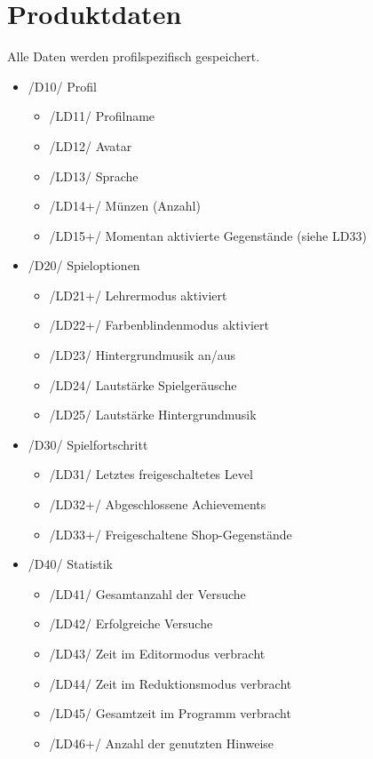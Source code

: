 \section{Produktdaten}

Alle Daten werden profilspezifisch gespeichert.

\begin{itemize}

\item /D10/ Profil
\begin{itemize}
\item /LD11/ Profilname
\item /LD12/ Avatar
\item /LD13/ Sprache
\item /LD14+/ Münzen (Anzahl)
\item /LD15+/ Momentan aktivierte Gegenstände (siehe LD33)
\end{itemize}

\item /D20/ Spieloptionen
\begin{itemize}
\item /LD21+/ Lehrermodus aktiviert
\item /LD22+/ Farbenblindenmodus aktiviert
\item /LD23/ Hintergrundmusik an/aus
\item /LD24/ Lautstärke Spielgeräusche
\item /LD25/ Lautstärke Hintergrundmusik
\end{itemize}

\item /D30/ Spielfortschritt
\begin{itemize}
\item /LD31/ Letztes freigeschaltetes Level
\item /LD32+/ Abgeschlossene Achievements
\item /LD33+/ Freigeschaltene Shop-Gegenstände
\end{itemize}

\item /D40/ Statistik
\begin{itemize}
\item /LD41/ Gesamtanzahl der Versuche
\item /LD42/ Erfolgreiche Versuche
\item /LD43/ Zeit im Editormodus verbracht
\item /LD44/ Zeit im Reduktionsmodus verbracht
\item /LD45/ Gesamtzeit im Programm verbracht
\item /LD46+/ Anzahl der genutzten Hinweise
\end{itemize}

\end{itemize}
